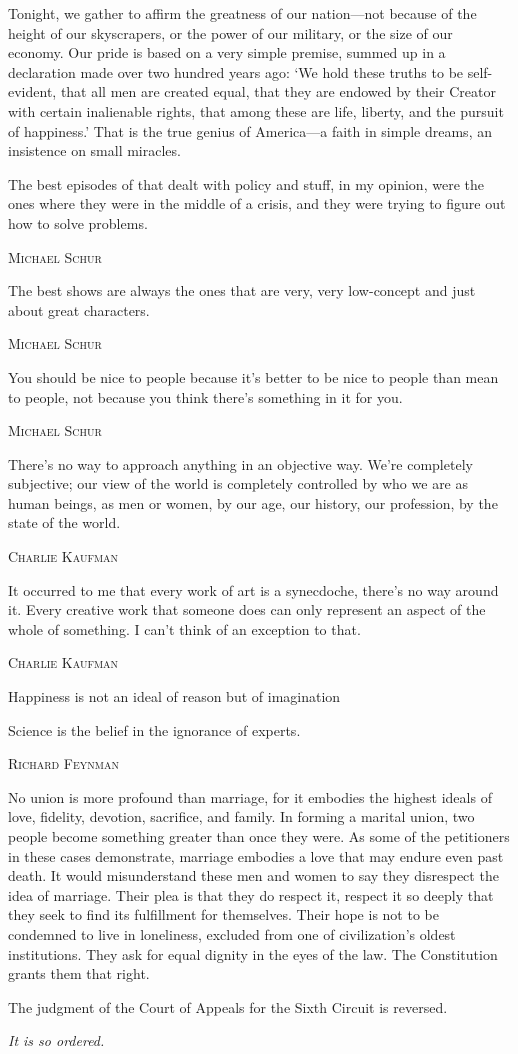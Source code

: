 \documentclass[../butidigress.tex]{subfiles}
\begin{document}
\par\postepi
\epigraph{Tonight, we gather to affirm the greatness of our nation---not because of the height of our skyscrapers, or the power of our military, or the size of our economy. Our pride is based on a very simple premise, summed up in a declaration made over two hundred years ago: `We hold these truths to be self-evident, that all men are created equal, that they are endowed by their Creator with certain inalienable rights, that among these are life, liberty, and the pursuit of happiness.' That is the true genius of America---a faith in simple dreams, an insistence on small miracles.}{}
\postepi
\epigraph{The best episodes of  that dealt with policy and stuff, in my opinion, were the ones where they were in the middle of a crisis, and they were trying to figure out how to solve problems.}{\textsc{Michael Schur}}
\postepi
\epigraph{The best shows are always the ones that are very, very low-concept and just about great characters.}{\textsc{Michael Schur}}
\postepi
\epigraph{You should be nice to people because it's better to be nice to people than mean to people, not because you think there's something in it for you.}{\textsc{Michael Schur}}
\postepi
\epigraph{There's no way to approach anything in an objective way. We're completely subjective; our view of the world is completely controlled by who we are as human beings, as men or women, by our age, our history, our profession, by the state of the world.}{\textsc{Charlie Kaufman}}
\postepi
\epigraph{It occurred to me that every work of art is a synecdoche, there's no way around it. Every creative work that someone does can only represent an aspect of the whole of something. I can't think of an exception to that.}{\textsc{Charlie Kaufman}}
\postepi
\epigraph{Happiness is not an ideal of reason but of imagination}{}
\postepi
\epigraph{Science is the belief in the ignorance of experts.}{\textsc{Richard Feynman}}
\postepi
\epigraph{No union is more profound than marriage, for it embodies the highest ideals of love, fidelity, devotion, sacrifice, and family. In forming a marital union, two people become something greater than once they were. As some of the petitioners in these cases demonstrate, marriage embodies a love that may endure even past death. It would misunderstand these men and women to say they disrespect the idea of marriage. Their plea is that they do respect it, respect it so deeply that they seek to find its fulfillment for themselves. Their hope is not to be condemned to live in loneliness, excluded from one of civilization's oldest institutions. They ask for equal dignity in the eyes of the law. The Constitution grants them that right.\par\hspace*{2em} The judgment of the Court of Appeals for the Sixth Circuit is reversed. \par\hfill \textit{It is so ordered.}}{}
\end{document}
